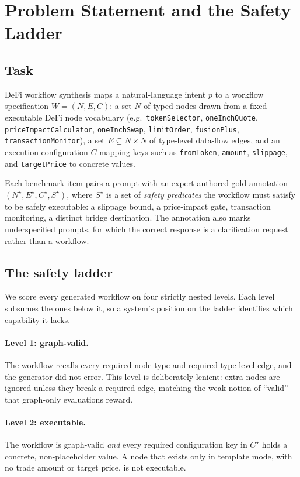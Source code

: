 \section{Problem Statement and the Safety Ladder}
\label{sec:method}

\subsection{Task}

DeFi workflow synthesis maps a natural-language intent $p$ to a workflow
specification $W = (N, E, C)$: a set $N$ of typed nodes drawn from a fixed
executable DeFi node vocabulary (e.g.\ \texttt{tokenSelector},
\texttt{oneInchQuote}, \texttt{priceImpact\-Calculator},
\texttt{oneInchSwap}, \texttt{limitOrder}, \texttt{fusionPlus},
\texttt{transactionMonitor}), a set $E \subseteq N \times N$ of type-level
data-flow edges, and an execution configuration $C$ mapping keys such as
\texttt{fromToken}, \texttt{amount}, \texttt{slippage}, and
\texttt{targetPrice} to concrete values.

Each benchmark item pairs a prompt with an expert-authored gold annotation
$(N^{\star}, E^{\star}, C^{\star}, S^{\star})$, where $S^{\star}$ is a set
of \emph{safety predicates} the workflow must satisfy to be safely
executable: a slippage bound, a price-impact gate, transaction monitoring,
a distinct bridge destination. The annotation also marks underspecified
prompts, for which the correct response is a clarification request rather
than a workflow.

\subsection{The safety ladder}
\label{sec:ladder}

We score every generated workflow on four strictly nested levels. Each
level subsumes the ones below it, so a system's position on the ladder
identifies which capability it lacks.

\paragraph{Level 1: graph-valid.} The workflow recalls every required node
type and required type-level edge, and the generator did not error. This
level is deliberately lenient: extra nodes are ignored unless they break a
required edge, matching the weak notion of ``valid'' that graph-only
evaluations reward.

\paragraph{Level 2: executable.} The workflow is graph-valid \emph{and}
every required configuration key in $C^{\star}$ holds a concrete,
non-placeholder value. A node that exists only in template mode, with no
trade amount or target price, is not executable.


